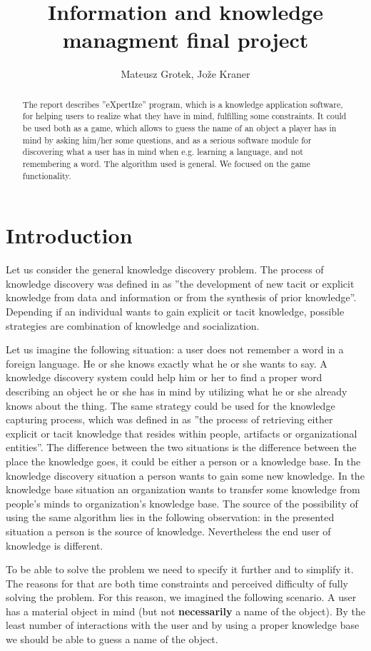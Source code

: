 \documentclass[a4paper]{article}
\title{Information and knowledge managment final project }
\author{Mateusz Grotek, Jože Kraner}
\date{}
\begin{document}
\maketitle
\begin{abstract}
The report describes ''eXpertIze'' program, which is a knowledge application software, for helping users to realize what they have in mind, fulfilling some constraints. It could be used both as a game, which allows to guess the name of an object a player has in mind by asking him/her some questions, and as a serious software module for discovering what a user has in mind when e.g. learning a language, and not remembering a word. The algorithm used is general. We focused on the game functionality.
\end{abstract}
\tableofcontents
\section{Introduction}
Let us consider the general knowledge discovery problem. The process of knowledge discovery was defined in \citet{Memon} as ''the development of new tacit or explicit knowledge from data and information or from the synthesis of prior knowledge''. Depending if an individual wants to gain explicit or tacit knowledge, possible strategies are combination of knowledge and socialization. 

Let us imagine the following situation: a user does not remember a word in a foreign language. He or she knows exactly what he or she wants to say. A knowledge discovery system could help him or her to find a proper word describing an object he or she has in mind by utilizing what he or she already knows about the thing. The same strategy could be used for the knowledge capturing process, which was defined in \citet{Memon} as ''the process of retrieving either explicit or tacit knowledge that resides within people, artifacts or organizational entities''. The difference between the two situations is the difference between the place the knowledge goes, it could be either a person or a knowledge base. In the knowledge discovery situation a person wants to gain some new knowledge. In the knowledge base situation an organization wants to transfer some knowledge from people's minds to organization's knowledge base. The source of the possibility of using the same algorithm lies in the following observation: in the presented situation a person is the source of knowledge. Nevertheless the end user of knowledge is different.

To be able to solve the problem we need to specify it further and to simplify it. The reasons for that are both time constraints and perceived difficulty of fully solving the problem. For this reason, we imagined the following scenario. A user has a material object in mind (but not \textbf{necessarily} a name of the object). By the least number of interactions with the user and by using a proper knowledge base we should be able to guess a name of the object. 
\end{document}
